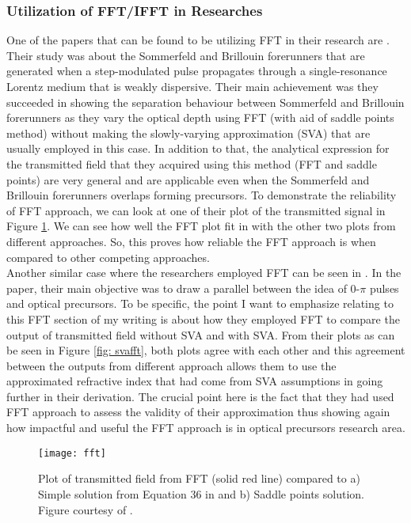 \subsubsection{Utilization of FFT/IFFT in Researches}
One of the papers that can be found to be utilizing FFT in their research are \cite{Macke2013}. Their study was about the Sommerfeld and Brillouin forerunners that are generated when a step-modulated pulse propagates through a single-resonance Lorentz medium that is weakly dispersive. Their main achievement was they succeeded in showing the separation behaviour between Sommerfeld and Brillouin forerunners as they vary the optical depth using FFT (with aid of saddle points method) without making the slowly-varying approximation (SVA) that are usually employed in this case. In addition to that, the analytical expression for the transmitted field that they acquired using this method (FFT and saddle points) are very general and are applicable even when the Sommerfeld and Brillouin forerunners overlaps forming precursors. To demonstrate the reliability of FFT approach, we can look at one of their plot of the transmitted signal in Figure \ref{fig: fft}. We can see how well the FFT plot fit in with the other two plots from different approaches. So, this proves how reliable the FFT approach is when compared to other competing approaches.\\

Another similar case where the researchers employed FFT can be seen in \cite{Jeong2008}. In the paper, their main objective was to draw a parallel between the idea of 0-$\pi$ pulses and optical precursors. To be specific, the point I want to emphasize relating to this FFT section of my writing is about how they employed FFT to compare the output of transmitted field without SVA and with SVA. From their plots as can be seen in Figure \ref{fig: svafft}, both plots agree with each other and this agreement between the outputs from different approach allows them to use the approximated refractive index that had come from SVA assumptions in going further in their derivation. The crucial point here is the fact that they had used FFT approach to assess the validity of their approximation thus showing again how impactful and useful the FFT approach is in optical precursors research area.

\begin{figure}[h!]
    \centering
    \texttt{[image: fft]}
    \caption{Plot of transmitted field from FFT (solid red line) compared to a) Simple solution from Equation 36 in \cite{Macke2013} and b) Saddle points solution. Figure courtesy of \cite{Macke2013}.}
    \label{fig: fft}
\end{figure}

